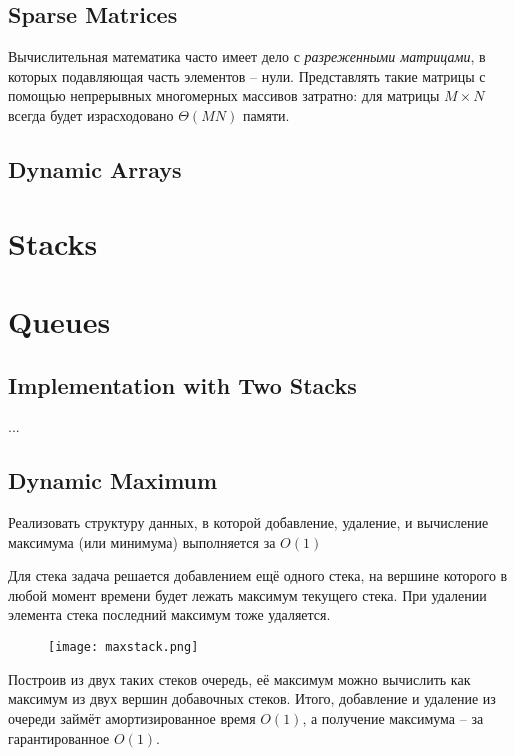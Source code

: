 \subsection*{Sparse Matrices}

Вычислительная математика часто имеет дело с {\em разреженными матрицами}, в которых подавляющая часть элементов -- нули. Представлять такие матрицы с помощью непрерывных многомерных массивов затратно: для матрицы $M\times N$ всегда будет израсходовано $\Theta(MN)$ памяти.

\subsection*{Dynamic Arrays}

\section{Stacks}

\section{Queues}

\subsection*{Implementation with Two Stacks}

...


\subsection*{Dynamic Maximum}

\begin{problem}
Реализовать структуру данных, в которой добавление, удаление, и вычисление максимума (или минимума) выполняется за $O(1)$
\end{problem}

Для стека задача решается добавлением ещё одного стека, на вершине которого в любой момент времени будет лежать максимум текущего стека. При удалении элемента стека последний максимум тоже удаляется.

\begin{figure}[!ht]
\centering
\texttt{[image: maxstack.png]}
\end{figure}

Построив из двух таких стеков очередь, её максимум можно вычислить как максимум из двух вершин добавочных стеков. Итого, добавление и удаление из очереди займёт амортизированное время $O(1)$, а получение максимума -- за гарантированное $O(1)$.

